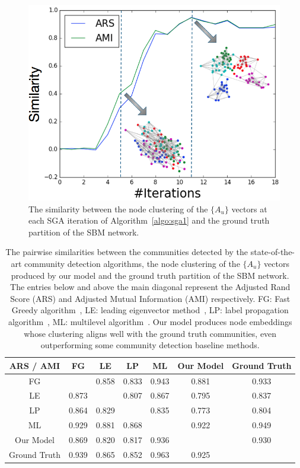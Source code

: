 \begin{figure}
    \centering
    \includegraphics[width=.8\textwidth]{img/chap3/converge.png}
    \caption{The similarity between the node clustering of the $\{A_u\}$ vectors at each SGA iteration of Algorithm~\ref{algo:sga1} and the ground truth partition of the SBM network.}
    \label{fig:alignment_figure}
\end{figure}

\begin{table}[]
\caption{The pairwise similarities between the communities detected by the state-of-the-art community detection algorithms, the node clustering of the $\{A_u\}$ vectors produced by our model and the ground truth partition of the SBM network. The entries below and above the main diagonal represent the Adjusted Rand Score (ARS) and Adjusted Mutual Information (AMI) respectively. FG: Fast Greedy algorithm~\cite{clauset2009power}, LE: leading eigenvector method~\cite{newman2006finding}, LP: label propagation algorithm~\cite{raghavan2007near}, ML: multilevel algorithm~\cite{blondel2008fast}. Our model produces node embeddings whose clustering aligns well with the ground truth communities, even outperforming some community detection baseline methods.}\label{tab:alignment_table}
    \centering
    \begin{tabular}{|c|cccccc|}
   \hline
    ARS / AMI & FG & LE & LP & ML &  Our Model &  Ground Truth\\
   \hline
FG &  & 0.858 & 0.833 & 0.943 & 0.881 & 0.933 \\
LE & 0.873 &  & 0.807 & 0.867 & 0.795 & 0.837 \\
LP & 0.864 & 0.829 &  & 0.835 & 0.773 & 0.804 \\
ML & 0.929 & 0.881 & 0.868 &  & 0.922 & 0.949 \\
Our Model & 0.869 & 0.820 & 0.817 & 0.936 &  & 0.930 \\
Ground Truth & 0.939 & 0.865 & 0.852 & 0.963 & 0.925 & \\
\hline
    \end{tabular}
\end{table}

